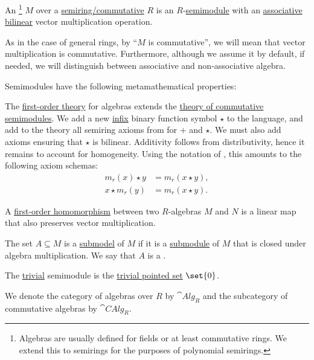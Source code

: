 \begin{definition}\label{def:algebra_over_semiring}\mimprovised
  An \footnote{Algebras are usually defined for fields or at least commutative rings. We extend this to semirings for the purposes of polynomial semirings.} \( M \) over a \hyperref[def:semiring/commutative]{semiring/commutative} \( R \) is an \( R \)-\hyperref[def:semimodule]{semimodule} with an \hyperref[def:magma/associative]{associative} \hyperref[def:multilinear_function]{bilinear} vector multiplication operation.

  As in the case of general rings, by \enquote{\( M \) is commutative}, we will mean that vector multiplication is commutative. Furthermore, although we assume it by default, if needed, we will distinguish between associative and non-associative algebra.

  Semimodules have the following metamathematical properties:
  \begin{thmenum}
     The \hyperref[def:first_order_theory]{first-order theory} for algebras extends the \hyperref[def:semimodule/theory]{theory of commutative semimodules}. We add a new \hyperref[rem:first_order_formula_conventions/infix]{infix} binary function symbol \( \star \) to the language, and add to the theory all semiring axioms from  for \( + \) and \( \star \). We must also add axioms ensuring that \( \star \) is bilinear. Additivity follows from distributivity, hence it remains to account for homogeneity. Using the notation of , this amounts to the following axiom schemas:
    \begin{align*}
      m_r(x) \star y &= m_r(x \star y), \\
      x \star m_r(y) &= m_r(x \star y).
    \end{align*}

     A \hyperref[def:first_order_homomorphism]{first-order homomorphism} between two \( R \)-algebras \( M \) and \( N \) is a linear map that also preserves vector multiplication.

     The set \( A \subseteq M \) is a \hyperref[thm:substructure_is_model]{submodel} of \( M \) if it is a \hyperref[def:monoid/submodel]{submodule} of \( M \) that is closed under algebra multiplication. We say that \( A \) is a .

     The \hyperref[thm:substructures_form_complete_lattice/bottom]{trivial} semimodule is the \hyperref[def:pointed_set/trivial]{trivial pointed set} \( \set{ 0 } \).

     We denote the category of algebras over \( R \) by \( \cat{Alg}_R \) and the subcategory of commutative algebras by \( \cat{CAlg}_R \).
  \end{thmenum}
\end{definition}

